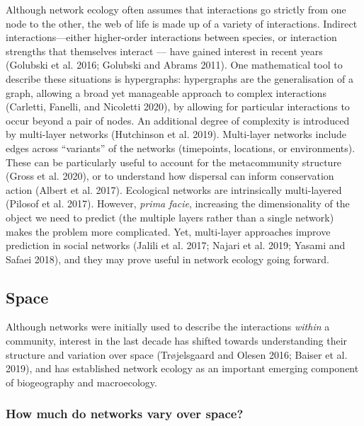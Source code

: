 \documentclass[11pt]{article}
\begin{document}
Although network ecology often assumes that interactions go strictly
from one node to the other, the web of life is made up of a variety of
interactions. Indirect interactions---either higher-order interactions
between species, or interaction strengths that themselves interact ---
have gained interest in recent years (Golubski et al. 2016; Golubski and
Abrams 2011). One mathematical tool to describe these situations is
hypergraphs: hypergraphs are the generalisation of a graph, allowing a
broad yet manageable approach to complex interactions (Carletti,
Fanelli, and Nicoletti 2020), by allowing for particular interactions to
occur beyond a pair of nodes. An additional degree of complexity is
introduced by multi-layer networks (Hutchinson et al. 2019). Multi-layer
networks include edges across ``variants'' of the networks (timepoints,
locations, or environments). These can be particularly useful to account
for the metacommunity structure (Gross et al. 2020), or to understand
how dispersal can inform conservation action (Albert et al. 2017).
Ecological networks are intrinsically multi-layered (Pilosof et al.
2017). However, \emph{prima facie}, increasing the dimensionality of the
object we need to predict (the multiple layers rather than a single
network) makes the problem more complicated. Yet, multi-layer approaches
improve prediction in social networks (Jalili et al. 2017; Najari et al.
2019; Yasami and Safaei 2018), and they may prove useful in network
ecology going forward.

\hypertarget{space}{%
\subsection{Space}\label{space}}

Although networks were initially used to describe the interactions
\emph{within} a community, interest in the last decade has shifted
towards understanding their structure and variation over space
(Trøjelsgaard and Olesen 2016; Baiser et al. 2019), and has established
network ecology as an important emerging component of biogeography and
macroecology.

\hypertarget{how-much-do-networks-vary-over-space}{%
\subsubsection{How much do networks vary over
space?}\label{how-much-do-networks-vary-over-space}}
\end{document}
